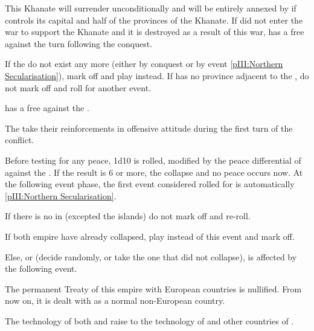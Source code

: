 \phpaix
\aparag This Khanate will surrender unconditionally and will be entirely
annexed by \RUS if \RUS controls its capital and half of the provinces of the
Khanate.
\aparag If \TUR did not enter the war to support the Khanate and it is
destroyed as a result of this war, \TUR has a free \CB against \RUS the turn
following the conquest.





\condition{}
\aparag If the  do not exist any more (either by conquest
or by event \ref{pIII:Northern Secularisation}), mark off and play \RD
instead.
\aparag If \RUS has no province adjacent to the , do not
mark off and roll for another event.

\phevnt
\aparag \RUS has a free \CB against the .

\phadm
\aparag The  take their reinforcements in offensive
attitude during the first turn of the conflict.

\phpaix
\aparag Before testing for any peace, 1d10 is rolled, modified by the peace
differential of \RUS against the . If the result is 6 or
more, the  collapse and no peace occurs now. At the
following event phase, the first event considered rolled for is automatically
\ref{pIII:Northern Secularisation}.





\condition{}
\aparag If there is no \COL in  (excepted the islands) do
not mark off and re-roll.

\aparag If both empire have already collapsed, play \RD instead of this event
and mark off.

\aparag Else, \paysInca or \paysAzteque (decide randomly, or take the one that
did not collapse), is affected by the following event.

\phevnt

\aparag The permanent Treaty of this empire with European countries is
nullified. From now on, it is dealt with as a normal non-European country.

\aparag The technology of both \paysInca and \paysAzteque raise to the
technology of \paysChine and other countries of \ROTW.

